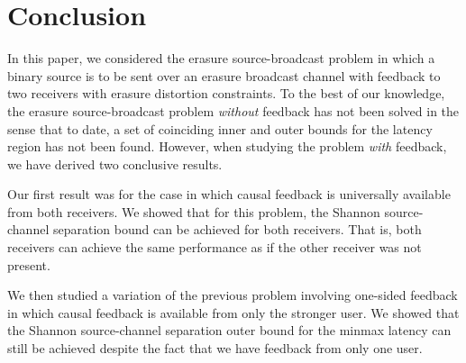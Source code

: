 \section{Conclusion}
\label{sec:conclusion}

In this paper, we considered the erasure source-broadcast problem in which a binary source is to be sent over an erasure broadcast channel with feedback to two receivers with erasure distortion constraints.  To the best of our knowledge, the erasure source-broadcast problem \emph{without} feedback has not been solved in the sense that to date, a set of coinciding inner and outer bounds for the latency region has not been found.  However, when studying the problem \emph{with} feedback, we have derived two conclusive results.  

Our first result was for the case in which causal feedback is universally available from both receivers.  We showed that for this problem, the Shannon source-channel separation bound can be achieved for both receivers.  That is, both receivers can achieve the same performance as if the other receiver was not present.  

We then studied a variation of the previous problem involving one-sided feedback in which causal feedback is available from only the stronger user.  We showed that the Shannon source-channel separation outer bound for the minmax latency can still be achieved despite the fact that we have feedback from only one user.  